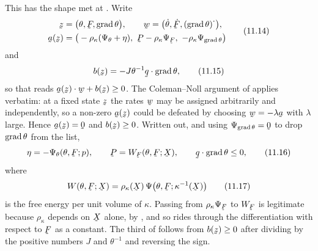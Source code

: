 This has the shape met at . Write
\begin{equation}
\begin{aligned}
   \bz&=\big(\theta,\bF,\grad\theta\big),\qquad
   \bw=\big(\dot\theta,\dot\bF,(\grad\theta)^{\textstyle\cdot}\big),\\
   \ba(\bz)&=\big(-\rho_{\kappa}(\Psi_{\theta}+\eta),\
   \bP-\rho_{\kappa}\Psi_{\bF},\ -\rho_{\kappa}\Psi_{\grad\theta}\big)
\end{aligned}
   \tag{11.14}\label{eq:11.14}
\end{equation}
and
\begin{equation}
   b(\bz)=-J\theta^{-1}\ip\bq{\grad\theta},
   \tag{11.15}\label{eq:11.15}
\end{equation}
so that  reads $\ba(\bz)\cdot\bw+b(\bz)\geq0$. The
Coleman--Noll argument of  applies verbatim: at a fixed state
$\bz$ the rates $\bw$ may be assigned arbitrarily and independently, so
a non-zero $\ba(\bz)$ could be defeated by choosing $\bw=-\lambda\ba$
with $\lambda$ large. Hence $\ba(\bz)=\bze$ and $b(\bz)\geq0$. Written
out, and using $\Psi_{\grad\theta}=\bze$ to drop $\operatorname{grad}\theta$ from the
list,
\begin{equation}
   \eta=-\Psi_{\theta}(\theta,\bF;p),\qquad
   \bP=W_{\bF}(\theta,\bF;\bX),\qquad
   \ip\bq{\grad\theta}\leq0 ,
   \tag{11.16}\label{eq:11.16}
\end{equation}
where
\begin{equation}
   W(\theta,\bF;\bX)=\rho_{\kappa}(\bX)\,
   \Psi\big(\theta,\bF;\kappa^{-1}(\bX)\big)
   \tag{11.17}\label{eq:11.17}
\end{equation}
is the free energy per unit volume of $\kappa$. Passing from
$\rho_{\kappa}\Psi_{\bF}$ to $W_{\bF}$ is legitimate because
$\rho_{\kappa}$ depends on $\bX$ alone, by , and so rides
through the differentiation with respect to $\bF$ as a constant. The
third of \eqr{11.16} follows from $b(\bz)\geq0$ after dividing by the
positive numbers $J$ and $\theta^{-1}$ and reversing the sign.


